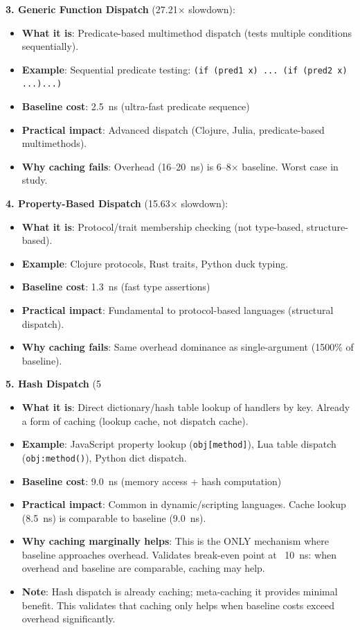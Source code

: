 \documentclass[sigplan,final]{acmart}
\begin{document}
\textbf{3. Generic Function Dispatch} (27.21× slowdown):
\begin{itemize}
  \item \textbf{What it is}: Predicate-based multimethod dispatch (tests multiple conditions sequentially).
  \item \textbf{Example}: Sequential predicate testing: \texttt{(if (pred1 x) ... (if (pred2 x) ...)...)}
  \item \textbf{Baseline cost}: 2.5~ns (ultra-fast predicate sequence)
  \item \textbf{Practical impact}: Advanced dispatch (Clojure, Julia, predicate-based multimethods).
  \item \textbf{Why caching fails}: Overhead (16--20~ns) is 6--8× baseline. Worst case in study.
\end{itemize}

\textbf{4. Property-Based Dispatch} (15.63× slowdown):
\begin{itemize}
  \item \textbf{What it is}: Protocol/trait membership checking (not type-based, structure-based).
  \item \textbf{Example}: Clojure protocols, Rust traits, Python duck typing.
  \item \textbf{Baseline cost}: 1.3~ns (fast type assertions)
  \item \textbf{Practical impact}: Fundamental to protocol-based languages (structural dispatch).
  \item \textbf{Why caching fails}: Same overhead dominance as single-argument (1500\% of baseline).
\end{itemize}

\textbf{5. Hash Dispatch} (5%
\begin{itemize}
  \item \textbf{What it is}: Direct dictionary/hash table lookup of handlers by key. Already a form of caching (lookup cache, not dispatch cache).
  \item \textbf{Example}: JavaScript property lookup (\texttt{obj[method]}), Lua table dispatch (\texttt{obj:method()}), Python dict dispatch.
  \item \textbf{Baseline cost}: 9.0~ns (memory access + hash computation)
  \item \textbf{Practical impact}: Common in dynamic/scripting languages. Cache lookup (8.5~ns) is comparable to baseline (9.0~ns).
  \item \textbf{Why caching marginally helps}: This is the ONLY mechanism where baseline approaches overhead. Validates break-even point at ~10~ns: when overhead and baseline are comparable, caching may help.
  \item \textbf{Note}: Hash dispatch is already caching; meta-caching it provides minimal benefit. This validates that caching only helps when baseline costs exceed overhead significantly.
\end{itemize}
\end{document}
